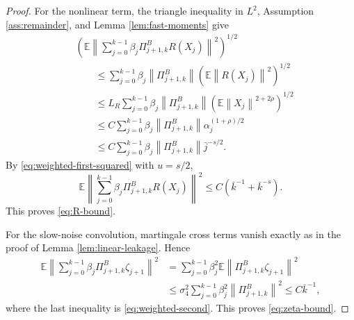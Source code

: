 \documentclass{article}
\newcommand{\E}{\mathbb{E}}
\newcommand{\norm}[1]{\left\lVert #1\right\rVert}
\begin{document}
\begin{proof}
For the nonlinear term, the triangle inequality in $L^2$, Assumption \ref{ass:remainder}, and Lemma \ref{lem:fast-moments} give
\[
\begin{aligned}
  &\left(\E\left\|\sum_{j=0}^{k-1}\beta_j\Pi^B_{j+1,k}R(X_j)\right\|^2\right)^{1/2}\\
  &\qquad\le \sum_{j=0}^{k-1}\beta_j\norm{\Pi^B_{j+1,k}}
       \left(\E\norm{R(X_j)}^2\right)^{1/2}\\
  &\qquad\le L_R\sum_{j=0}^{k-1}\beta_j\norm{\Pi^B_{j+1,k}}
       \left(\E\norm{X_j}^{2+2\rho}\right)^{1/2}\\
  &\qquad\le C\sum_{j=0}^{k-1}\beta_j\norm{\Pi^B_{j+1,k}}\alpha_j^{(1+\rho)/2}\\
  &\qquad\le C\sum_{j=0}^{k-1}\beta_j\norm{\Pi^B_{j+1,k}}\bar j^{-s/2}.
\end{aligned}
\]
By \eqref{eq:weighted-first-squared} with $u=s/2$,
\[
  \E\left\|\sum_{j=0}^{k-1}\beta_j\Pi^B_{j+1,k}R(X_j)\right\|^2
  \le C\left(\bar k^{-1}+\bar k^{-s}\right).
\]
This proves \eqref{eq:R-bound}.

For the slow-noise convolution, martingale cross terms vanish exactly as in the proof of Lemma \ref{lem:linear-leakage}. Hence
\[
\begin{aligned}
  \E\left\|\sum_{j=0}^{k-1}\beta_j\Pi^B_{j+1,k}\zeta_{j+1}\right\|^2
  &=\sum_{j=0}^{k-1}\beta_j^2\E\norm{\Pi^B_{j+1,k}\zeta_{j+1}}^2\\
  &\le \sigma_4^2\sum_{j=0}^{k-1}\beta_j^2\norm{\Pi^B_{j+1,k}}^2
  \le C\bar k^{-1},
\end{aligned}
\]
where the last inequality is \eqref{eq:weighted-second}. This proves \eqref{eq:zeta-bound}.
\end{proof}
\end{document}
